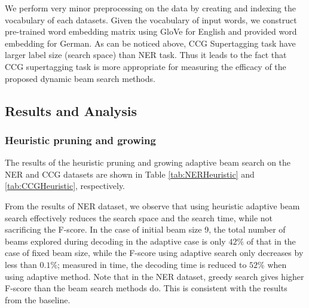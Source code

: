 \documentclass[11pt,a4paper]{article}
\begin{document}
We perform very minor preprocessing on the data by creating and indexing the vocabulary of each datasets. Given the vocabulary of input words, we construct pre-trained word embedding matrix using GloVe for English and provided word embedding \cite{goyal2017continuous} for German. 
As can be noticed above, CCG Supertagging task have larger label size (search space) than NER task. Thus it leads to the fact that CCG supertagging task is more appropriate for measuring the efficacy of the proposed dynamic beam search methods.  



\subsection{Results and Analysis}

\subsubsection{Heuristic pruning and growing}

The results of the heuristic pruning and growing adaptive beam search on the NER and CCG datasets are shown in Table \ref{tab:NERHeuristic} and \ref{tab:CCGHeuristic}, respectively.

From the results of NER dataset, we observe that using heuristic adaptive beam search effectively reduces the search space and the search time, while not sacrificing the F-score. In the case of initial beam size 9, the total number of beams explored during decoding in the adaptive case is only $42\%$ of that in the case of fixed beam size, while the F-score using adaptive search only decreases by less than $0.1\%$; measured in time, the decoding time is reduced to $52\%$ when using adaptive method. Note that in the NER dataset, greedy search gives higher F-score than the beam search methods do. This is consistent with the results from the baseline.
\end{document}
